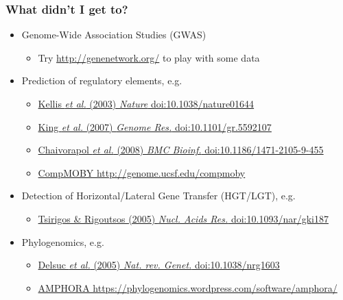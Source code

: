 
%
\begin{frame}
  \frametitle{What didn't I get to?}
  \begin{itemize}
    \item   \textcolor{hutton_green}{Genome-Wide Association Studies (GWAS)}
    \begin{itemize}
      \item   Try \href{http://genenetwork.org/}{http://genenetwork.org/} to play with some data
    \end{itemize}
    \item Prediction of regulatory elements, e.g.
    \begin{itemize}
      \item {\tiny\href{http://dx.doi.org/10.1038/nature01644}
                              {Kellis \textit{et al.} (2003) \textit{Nature} doi:10.1038/nature01644}}
      \item {\tiny\href{http://dx.doi.org/10.1101/gr.5592107}
                              {King \textit{et al.} (2007) \textit{Genome Res.} doi:10.1101/gr.5592107}}
      \item {\tiny\href{http://dx.doi.org/10.1186/1471-2105-9-455}
                              {Chaivorapol \textit{et al.} (2008) \textit{BMC Bioinf.} doi:10.1186/1471-2105-9-455}}
      \item {\tiny\href{http://genome.ucsf.edu/compmoby}
                              {CompMOBY http://genome.ucsf.edu/compmoby}}
    \end{itemize}
    \item   \textcolor{hutton_purple}{Detection of Horizontal/Lateral Gene Transfer (HGT/LGT), e.g.}
    \begin{itemize}
      \item {\tiny\href{http://dx.doi.org/10.1093/nar/gki187}
                              {Tsirigos \& Rigoutsos (2005) \textit{Nucl. Acids Res.} doi:10.1093/nar/gki187}}
    \end{itemize}
    \item   \textcolor{RawSienna}{Phylogenomics, e.g.}
    \begin{itemize}
      \item {\tiny\href{http://dx.doi.org/10.1038/nrg1603}
                              {Delsuc \textit{et al.} (2005) \textit{Nat. rev. Genet.} doi:10.1038/nrg1603}}
      \item {\tiny\href{https://phylogenomics.wordpress.com/software/amphora/}
                              {AMPHORA https://phylogenomics.wordpress.com/software/amphora/}}
    \end{itemize}
  \end{itemize}
\end{frame}

